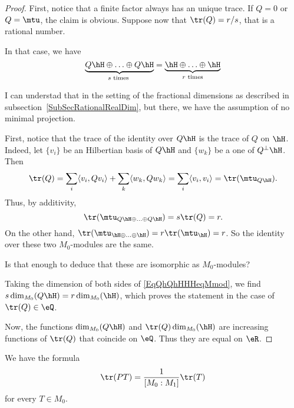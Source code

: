 \begin{proof}
First, notice that a finite factor always has an unique trace. If $Q=0$ or $Q=\mtu$, the claim is obvious. Suppose now that $\tr(Q)=r/s$, that is a rational number.

In that case, we have
\begin{equation}		 \label{EqQhQhHHHeqMmod}
    \underbrace{Q\hH\oplus\ldots\oplus Q\hH}_{s\text{ times }} =\underbrace{\hH\oplus\ldots\oplus \hH}_{ r\text{ times}}
\end{equation}
\begin{probleme}
I can understad that in the setting of the fractional dimensions as described in subsection~\ref{SubSecRationalRealDim}, but there, we have the assumption of no minimal projection.
\end{probleme}
First, notice that the trace of the identity over $Q\hH$ is the trace of $Q$ on $\hH$. Indeed, let $\{ v_i \}$ be an Hilbertian basis of $Q\hH$ and $\{ w_k \}$ be a one of $Q^{\perp}\hH$. Then
\begin{equation}
	\tr(Q)=\sum_i\langle v_i, Qv_i\rangle +\sum_k\langle w_k, Qw_k\rangle =\sum_i\langle v_i, v_i\rangle =\tr(\mtu_{Q\hH}).
\end{equation}
Thus, by additivity,
\begin{equation}
	\tr(\mtu_{Q\hH\oplus\ldots\oplus Q\hH})=s\tr(Q)=r.
\end{equation}
On the other hand, $\tr(\mtu_{\hH\oplus\ldots\oplus\hH})=r\tr(\mtu_{\hH})=r$. So the identity over these two $M_0$-modules are the same.
\begin{probleme}
Is that enough to deduce that these are isomorphic as $M_0$-modules?
\end{probleme}
Taking the dimension of both sides of \eqref{EqQhQhHHHeqMmod}, we find $s\dim_{M_0}(Q\hH)=r\dim_{M_0}(\hH)$, which proves the statement in the case of $\tr(Q)\in\eQ$.

Now, the functions $\dim_{M_0}(Q\hH)$ and $\tr(Q)\dim_{M_0}(\hH)$ are increasing functions of $\tr(Q)$ that coincide on $\eQ$. Thus they are equal on $\eR$.

\end{proof}



\begin{proposition}		\label{ProptrPTMNtrT}
We have the formula
\begin{equation}		\label{EqClaimLemPTfracMNtrT}
	\tr(PT)=\frac{1}{ [M_0:M_1] }\tr(T)
\end{equation}
for every $T\in M_0$.
\end{proposition}



